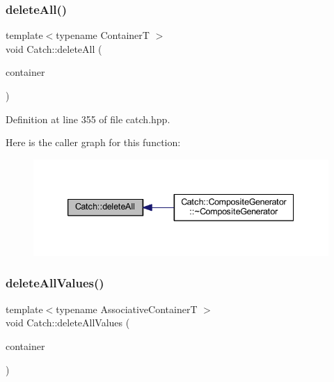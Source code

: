 \hypertarget{namespace_catch_aadf9786550a462740ec355f8219863a9}{}\label{namespace_catch_aadf9786550a462740ec355f8219863a9} 
\subsubsection{\texorpdfstring{delete\+All()}{deleteAll()}}
{\footnotesize\ttfamily template$<$typename ContainerT $>$ \\
void Catch\+::delete\+All (\begin{DoxyParamCaption}\item[{ContainerT \&}]{container }\end{DoxyParamCaption})\hspace{0.3cm}{\ttfamily [inline]}}



Definition at line 355 of file catch.\+hpp.

Here is the caller graph for this function\+:\nopagebreak
\begin{figure}[H]
\begin{center}
\leavevmode
\includegraphics[width=339pt]{namespace_catch_aadf9786550a462740ec355f8219863a9_icgraph}
\end{center}
\end{figure}
\hypertarget{namespace_catch_af2fcec1d4bd984fe19ff8b9a432c36a8}{}\label{namespace_catch_af2fcec1d4bd984fe19ff8b9a432c36a8} 
\subsubsection{\texorpdfstring{delete\+All\+Values()}{deleteAllValues()}}
{\footnotesize\ttfamily template$<$typename Associative\+ContainerT $>$ \\
void Catch\+::delete\+All\+Values (\begin{DoxyParamCaption}\item[{Associative\+ContainerT \&}]{container }\end{DoxyParamCaption})\hspace{0.3cm}{\ttfamily [inline]}}



